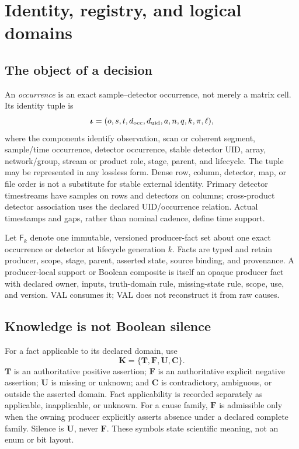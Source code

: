 \section{Identity, registry, and logical domains}
\label{sec:notation}

\subsection{The object of a decision}

An \emph{occurrence} is an exact sample--detector occurrence, not merely a
matrix cell. Its identity tuple is
\[
 \boldsymbol\iota=(o,s,t,d_{\rm occ},d_{\rm uid},a,n,q,k,\pi,\ell),
\]
where the components identify observation, scan or coherent segment,
sample/time occurrence, detector occurrence, stable detector UID, array,
network/group, stream or product role, stage, parent, and lifecycle. The tuple
may be represented in any lossless form. Dense row, column, detector, map, or
file order is not a substitute for stable external identity. Primary detector
timestreams have samples on rows and detectors on columns; cross-product
detector association uses the declared UID/occurrence relation. Actual
timestamps and gaps, rather than nominal cadence, define time support.

Let $\mathsf F_k$ denote one immutable, versioned producer-fact set about one
exact occurrence or detector at lifecycle generation $k$. Facts are typed and
retain producer, scope, stage, parent, asserted state, source binding, and
provenance. A producer-local support or Boolean composite is itself an opaque
producer fact with declared owner, inputs, truth-domain rule, missing-state
rule, scope, use, and version. VAL consumes it; VAL does not reconstruct it
from raw causes.

\subsection{Knowledge is not Boolean silence}

For a fact applicable to its declared domain, use
\[
 \mathbf K=\{\mathbf T,\mathbf F,\mathbf U,\mathbf C\}.
\]
$\mathbf T$ is an authoritative positive assertion; $\mathbf F$ is an
authoritative explicit negative assertion; $\mathbf U$ is missing or unknown;
and $\mathbf C$ is contradictory, ambiguous, or outside the asserted domain.
Fact applicability is recorded separately as applicable, inapplicable, or
unknown. For a cause family, $\mathbf F$ is admissible only when the owning
producer explicitly asserts absence under a declared complete family.
Silence is $\mathbf U$, never $\mathbf F$. These symbols state scientific
meaning, not an enum or bit layout.

